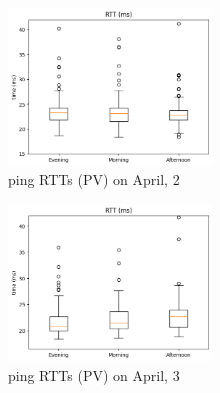 \documentclass[a4paper,10pt]{article}
\begin{document}
\begin{multicols}{2}

        \begin{figure}[H]
                \centering
                \includegraphics[width=0.48\textwidth]{Boxplot_hours_PV_april_2.png}
                \caption{\small ping RTTs (PV) on April, 2}
                \label{fig:Boxplot_hours_2_PV}
        \end{figure}
        
        \begin{figure}[H]
                \centering
                \includegraphics[width=0.48\textwidth]{Boxplot_hours_PV_april_3.png}
                \caption{\small ping RTTs (PV) on April, 3}
                \label{fig:Boxplot_hours_3_PV}
        \end{figure}


\end{multicols}
\end{document}
